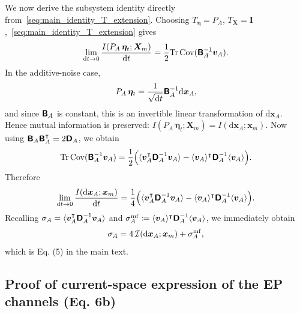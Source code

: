 We now derive the subsystem identity directly from~\eqref{seq:main_identity_T_extension}. Choosing $T_{\bm\eta}=P_A$, $T_{\bm X}=\mathbf I$,~\eqref{seq:main_identity_T_extension} gives
\[
    \lim_{\mathrm dt\rightarrow0}\frac{I(P_A\,\bm\eta_t;\bm X_m)}{\mathrm dt}
    =\frac{1}{2}\mathrm{Tr}\,\mathrm{Cov}(\boldsymbol{\mathsf{B}}_A^{-1}\bm v_A).
\]
In the additive-noise case,
\[
    P_A\,\bm\eta_t=\frac{1}{\sqrt{\mathrm dt}}\boldsymbol{\mathsf{B}}_A^{-1}\mathrm d\bm x_A,
\]
and since $\boldsymbol{\mathsf{B}}_A$ is constant, this is an invertible linear transformation of $\mathrm d\bm x_A$. Hence mutual information is preserved: $I(P_A\,\bm\eta_t;\bm X_m)=I(\mathrm d\bm x_A;\bm x_m)$.
Now using $\boldsymbol{\mathsf{B}}_A\boldsymbol{\mathsf{B}}_A^\intercal=2\boldsymbol{\mathsf{D}}_A$, we obtain
\[
    \mathrm{Tr}\,\mathrm{Cov}(\boldsymbol{\mathsf{B}}_A^{-1}\bm v_A)
    =\frac{1}{2}\Big(\langle\bm v_A^\intercal\boldsymbol{\mathsf{D}}_A^{-1}\bm v_A\rangle-\langle\bm v_A\rangle^\intercal\boldsymbol{\mathsf{D}}_A^{-1}\langle\bm v_A\rangle\Big).
\]
Therefore
\[
    \lim_{\mathrm dt\rightarrow0}\frac{I(\mathrm d\bm x_A;\bm x_m)}{\mathrm dt}
    =\frac{1}{4}\Big(\langle\bm v_A^\intercal\boldsymbol{\mathsf{D}}_A^{-1}\bm v_A\rangle-\langle\bm v_A\rangle^\intercal\boldsymbol{\mathsf{D}}_A^{-1}\langle\bm v_A\rangle\Big).
\]
Recalling $\sigma_A=\langle\bm v_A^\intercal\boldsymbol{\mathsf{D}}_A^{-1}\bm v_A\rangle$ and $\sigma_A^{\rm mf}\coloneq\langle\bm v_A\rangle^\intercal\boldsymbol{\mathsf{D}}_A^{-1}\langle\bm v_A\rangle$, we immediately obtain
\begin{equation}
    \sigma_A=4\,\mathcal I(\mathrm d\bm x_A;\bm x_m)+\sigma_A^{\rm mf},
    \label{seq:local_EP_equality}
\end{equation}
which is Eq. (5) in the main text.

\subsection{Proof of current-space expression of the EP channels (Eq. 6b)}
\vspace*{-0.6\baselineskip}

